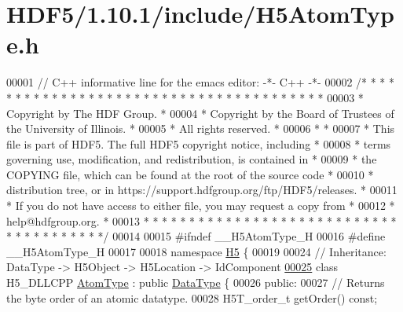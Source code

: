 \hypertarget{_h_d_f5_21_810_81_2include_2_h5_atom_type_8h_source}{}\section{H\+D\+F5/1.10.1/include/\+H5\+Atom\+Type.h}
\label{_h_d_f5_21_810_81_2include_2_h5_atom_type_8h_source}

\begin{DoxyCode}
00001 \textcolor{comment}{// C++ informative line for the emacs editor: -*- C++ -*-}
00002 \textcolor{comment}{/* * * * * * * * * * * * * * * * * * * * * * * * * * * * * * * * * * * * * * *}
00003 \textcolor{comment}{ * Copyright by The HDF Group.                                               *}
00004 \textcolor{comment}{ * Copyright by the Board of Trustees of the University of Illinois.         *}
00005 \textcolor{comment}{ * All rights reserved.                                                      *}
00006 \textcolor{comment}{ *                                                                           *}
00007 \textcolor{comment}{ * This file is part of HDF5.  The full HDF5 copyright notice, including     *}
00008 \textcolor{comment}{ * terms governing use, modification, and redistribution, is contained in    *}
00009 \textcolor{comment}{ * the COPYING file, which can be found at the root of the source code       *}
00010 \textcolor{comment}{ * distribution tree, or in https://support.hdfgroup.org/ftp/HDF5/releases.  *}
00011 \textcolor{comment}{ * If you do not have access to either file, you may request a copy from     *}
00012 \textcolor{comment}{ * help@hdfgroup.org.                                                        *}
00013 \textcolor{comment}{ * * * * * * * * * * * * * * * * * * * * * * * * * * * * * * * * * * * * * * */}
00014 
00015 \textcolor{preprocessor}{#ifndef \_\_H5AtomType\_H}
00016 \textcolor{preprocessor}{#define \_\_H5AtomType\_H}
00017 
00018 \textcolor{keyword}{namespace }\hyperlink{namespace_h5}{H5} \{
00019 
00024 \textcolor{comment}{// Inheritance: DataType -> H5Object -> H5Location -> IdComponent}
\hyperlink{class_h5_1_1_atom_type}{00025} \textcolor{keyword}{class }H5\_DLLCPP \hyperlink{class_h5_1_1_atom_type}{AtomType} : \textcolor{keyword}{public} \hyperlink{class_h5_1_1_data_type}{DataType} \{
00026    \textcolor{keyword}{public}:
00027         \textcolor{comment}{// Returns the byte order of an atomic datatype.}
00028         H5T\_order\_t getOrder() \textcolor{keyword}{const};

\end{DoxyCode}
